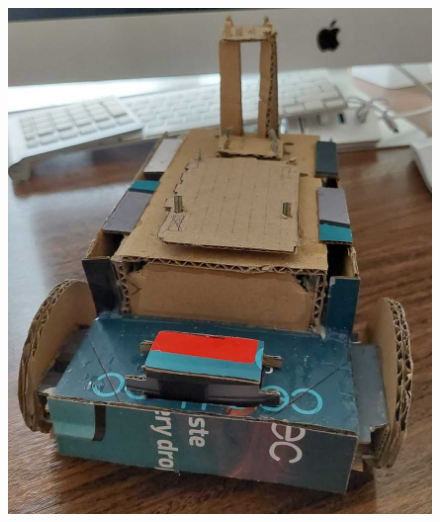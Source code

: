 \begin{figure}[ht!]
	\centering
	\begin{minipage}{0.4\linewidth}
		\centering
		\includegraphics[width=\linewidth]{figs/cap5/boceto_carton5.jpeg}
		\caption*{\centering}
	\end{minipage}
	\hspace{2cm}
	\begin{minipage}{0.4\linewidth}
		\centering

\end{minipage}
\end{figure}
